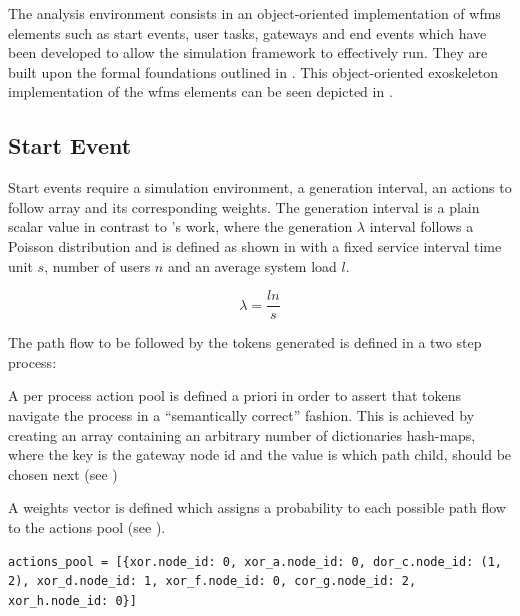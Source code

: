 The analysis environment consists in an object-oriented implementation of \gls{wfms} elements such as start events, user tasks, gateways and end events which have been developed to allow the simulation framework to effectively run. They are built upon the formal foundations outlined in . This object-oriented exoskeleton implementation of the \gls{wfms} elements can be seen depicted in .


\subsection{Start Event}
\label{subsec:start_event}

Start events require a simulation environment, a generation interval, an actions to follow array and its corresponding weights. The generation interval is a plain scalar value in contrast to \citet{Zeng2005}'s work, where the generation $\lambda$ interval follows a Poisson distribution and is defined as shown in  with a fixed service interval time unit $s$, number of users $n$ and an average system load $l$.

\begin{equation}
\label{eq:generation_interval}
	\lambda = \frac{l n}{s}
\end{equation}

The path flow to be followed by the tokens generated is defined in a two step process:
\begin{enumerate*}
	\item A per process action pool is defined a priori in order to assert that tokens navigate the process in a ``semantically correct'' fashion. This is achieved by creating an array containing an arbitrary number of dictionaries \ie hash-maps, where the key is the gateway node id and the value is which path \ie child, should be chosen next (see )
	\item A weights vector is defined which assigns a probability to each possible path flow to the actions pool (see ).
\end{enumerate*}

\begin{lstlisting}[caption=Actions pool,label=lst:actions_pool,style=CustomPython]
    actions_pool = [{xor.node_id: 0, xor_a.node_id: 0, dor_c.node_id: (1, 2), xor_d.node_id: 1, xor_f.node_id: 0, cor_g.node_id: 2, xor_h.node_id: 0}]
\end{lstlisting}

